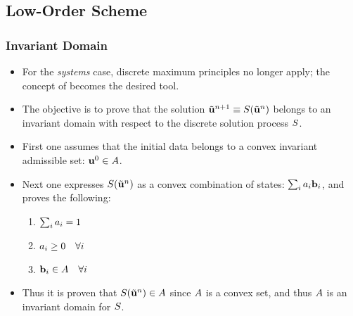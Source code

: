 \documentclass{beamer} \useoutertheme{infolines}
\begin{document}
\subsection{Low-Order Scheme}
\begin{frame}
\frametitle{Invariant Domain}

\begin{itemize}
  \item For the \emph{systems} case, discrete maximum principles no longer apply;
    the concept of  becomes the desired tool.
  \item The objective is to prove that the solution
    $\tilde{\mathbf{u}}^{n+1}\equiv S
      (\tilde{\mathbf{u}}^n)$ belongs to an invariant domain with
    respect to the discrete solution process $S$.
  \item First one assumes that the initial data belongs
    to a convex invariant admissible set: $\mathbf{u}^0\in A$.
  \item Next one expresses $S(\tilde{\mathbf{u}}^n)$
    as a convex combination of states:
    $\sum_ia_i\mathbf{b}_i$, and proves the following:
    \begin{enumerate}
      \item $\sum_i a_i = 1$
      \item $a_i \geq 0 \quad \forall i$
      \item $\mathbf{b}_i \in A \quad \forall i$
    \end{enumerate}
  \item Thus it is proven that
    $S(\tilde{\mathbf{u}}^n)\in A$ since
    $A$ is a convex set, and thus $A$ is an invariant
    domain for $S$.
\end{itemize}

\end{frame}
\end{document}
